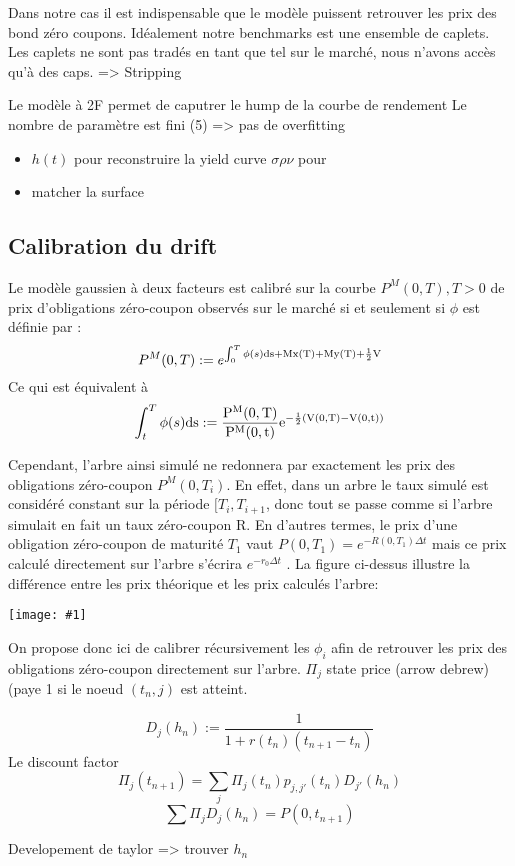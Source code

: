 \documentclass[paper=a4, fontsize=11pt]{report}
\numberwithin{equation}{section}		%
\numberwithin{figure}{section}			%
\numberwithin{table}{section}				%
\theoremstyle{definition}
\newcommand{\IMG}[3]{
  \begin{center}
    \texttt{[image: \#1]}%
    \end{center}
}
\begin{document}
Dans notre cas il est indispensable que le modèle puissent retrouver les prix des bond zéro coupons.
Idéalement notre benchmarks est une ensemble de caplets. Les caplets ne sont pas tradés en tant que tel sur le marché, nous n'avons accès qu'à des caps. => Stripping

Le modèle à 2F permet de caputrer le hump de la courbe de rendement
Le nombre de paramètre est fini (5) => pas de overfitting


\begin{itemize}
\item $h(t)$ pour reconstruire la yield curve $\sigma \rho \nu$ pour
\item  matcher la surface
\end{itemize}

\subsection{Calibration du drift}
Le modèle gaussien à deux facteurs est calibré sur la
courbe $P^M (0, T ), T > 0$ de prix d’obligations zéro-coupon observés sur le
marché si et seulement si $\phi$ est définie par :
$$P^M(0, T) := e^{ \int_0^T \phi(s) \rm{d}s + M x(T) +M y(T) + \frac{1}{2} V}$$
Ce qui est équivalent à 
$$ \int_t^T \phi(s) \rm{d}s := \frac{P^M(0, T)}{P^M(0, t)} e^{-\frac{1}{2}(V(0, T) - V(0, t))}$$

Cependant, l’arbre ainsi simulé ne redonnera par exactement les prix des
obligations zéro-coupon $P^M(0, T_i)$. En effet, dans un arbre le taux simulé est
considéré constant sur la période $[T_i, T_{i+1}$, donc tout se passe comme
si l’arbre simulait en fait un taux zéro-coupon R. En d’autres termes, le prix
d’une obligation zéro-coupon de maturité $T_1$ vaut
$P(0, T_1 ) = e^{-R(0, T_1) \Delta t}$
mais ce prix calculé directement sur l’arbre s’écrira $e^{-r_0\Delta t}$ .
La figure ci-dessus illustre la différence entre les prix théorique et les prix calculés l'arbre:
\IMG{img/pending.jpg}{Diff Slice}{0.2}

On propose donc ici de calibrer récursivement les $\phi_i$ afin de
retrouver les prix des obligations zéro-coupon directement sur l’arbre. 
$\Pi_j$ state price (arrow debrew) (paye 1 si le noeud $(t_n, j)$ est atteint.

$$D_j(h_n) := \frac{1}{1 + r(t_n)(t_{n+1} - t_n)} $$ Le discount factor
$$ \Pi_j(t_{n+1}) = \sum_j \Pi_j(t_n) p_{j, j'}(t_n) D_{j'}(h_n)$$
$$ \sum \Pi_j D_j(h_n) = P(0, t_{n+1}) $$

Developement de taylor => trouver $h_n$
\end{document}
